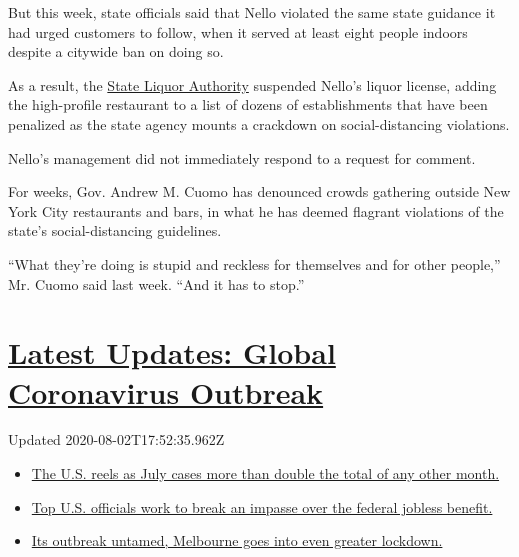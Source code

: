 But this week, state officials said that Nello violated the same state
guidance it had urged customers to follow, when it served at least eight
people indoors despite a citywide ban on doing so.

As a result, the \href{https://sla.ny.gov/}{State Liquor Authority}
suspended Nello's liquor license, adding the high-profile restaurant to
a list of dozens of establishments that have been penalized as the state
agency mounts a crackdown on social-distancing violations.

Nello's management did not immediately respond to a request for comment.

For weeks, Gov. Andrew M. Cuomo has denounced crowds gathering outside
New York City restaurants and bars, in what he has deemed flagrant
violations of the state's social-distancing guidelines.

``What they're doing is stupid and reckless for themselves and for other
people,'' Mr. Cuomo said last week. ``And it has to stop.''

\hypertarget{latest-updates-global-coronavirus-outbreak}{%
\section{\texorpdfstring{\href{https://www.nytimes3xbfgragh.onion/2020/08/01/world/coronavirus-covid-19.html?action=click\&pgtype=Article\&state=default\&region=MAIN_CONTENT_1\&context=storylines_live_updates}{Latest
Updates: Global Coronavirus
Outbreak}}{Latest Updates: Global Coronavirus Outbreak}}\label{latest-updates-global-coronavirus-outbreak}}

Updated 2020-08-02T17:52:35.962Z

\begin{itemize}
\tightlist
\item
  \href{https://www.nytimes3xbfgragh.onion/2020/08/01/world/coronavirus-covid-19.html?action=click\&pgtype=Article\&state=default\&region=MAIN_CONTENT_1\&context=storylines_live_updates\#link-34047410}{The
  U.S. reels as July cases more than double the total of any other
  month.}
\item
  \href{https://www.nytimes3xbfgragh.onion/2020/08/01/world/coronavirus-covid-19.html?action=click\&pgtype=Article\&state=default\&region=MAIN_CONTENT_1\&context=storylines_live_updates\#link-780ec966}{Top
  U.S. officials work to break an impasse over the federal jobless
  benefit.}
\item
  \href{https://www.nytimes3xbfgragh.onion/2020/08/01/world/coronavirus-covid-19.html?action=click\&pgtype=Article\&state=default\&region=MAIN_CONTENT_1\&context=storylines_live_updates\#link-2bc8948}{Its
  outbreak untamed, Melbourne goes into even greater lockdown.}
\end{itemize}

